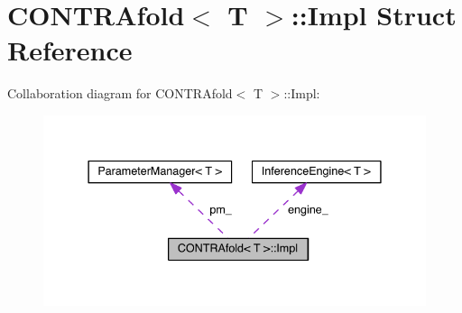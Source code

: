 \hypertarget{struct_c_o_n_t_r_afold_1_1_impl}{\section{C\+O\+N\+T\+R\+Afold$<$ T $>$\+:\+:Impl Struct Reference}
\label{struct_c_o_n_t_r_afold_1_1_impl}
}


Collaboration diagram for C\+O\+N\+T\+R\+Afold$<$ T $>$\+:\+:Impl\+:
\nopagebreak
\begin{figure}[H]
\begin{center}
\leavevmode
\includegraphics[width=337pt]{struct_c_o_n_t_r_afold_1_1_impl__coll__graph}
\end{center}
\end{figure}

